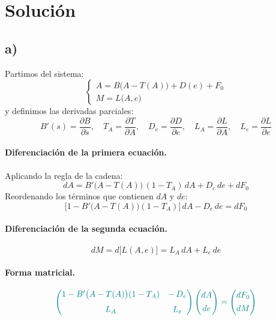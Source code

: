 \documentclass{article}
\begin{document}
\newpage
\section*{Solución}

\subsection*{a)}

Partimos del sistema:
\[
\begin{cases}
A = B\bigl(A - T(A)\bigr) + D(e) + F_0\\[6pt]
M = L\bigl(A,e\bigr)
\end{cases}
\]
y definimos las derivadas parciales:
\[
B'(s) = \frac{\partial B}{\partial s},
\quad
T_A = \frac{\partial T}{\partial A},
\quad
D_e = \frac{\partial D}{\partial e},
\quad
L_A = \frac{\partial L}{\partial A},
\quad
L_e = \frac{\partial L}{\partial e}
\]

\paragraph{Diferenciación de la primera ecuación.}

Aplicando la regla de la cadena:
\[
dA = B'\bigl(A - T(A)\bigr)\,(1 - T_A)\,dA + D_e\,de + dF_0
\]
Reordenando los términos que contienen \(dA\) y \(de\):
\[
\bigl[1 - B'\bigl(A - T(A)\bigr)(1 - T_A)\bigr]\,dA - D_e\,de = dF_0
\]

\paragraph{Diferenciación de la segunda ecuación.}

\[
dM = d\bigl[L(A,e)\bigr] = L_A\,dA + L_e\,de
\]

\paragraph{Forma matricial.}

\[
\color{teal}
\begin{pmatrix}
1 - B'\bigl(A - T(A)\bigr)(1 - T_A) & -\,D_e\\[6pt]
L_A & L_e
\end{pmatrix}
\begin{pmatrix}
dA\\[4pt]
de
\end{pmatrix}
=
\begin{pmatrix}
dF_0\\[4pt]
dM
\end{pmatrix}
\]
\end{document}
